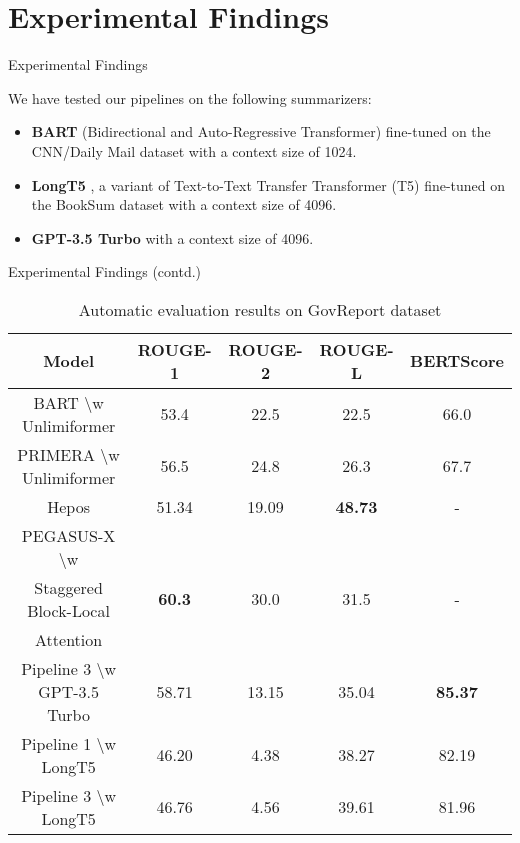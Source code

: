 \section{Experimental Findings}

\begin{frame}{Experimental Findings}

	We have tested our pipelines on the following summarizers:
	
	\begin{itemize}
		\item<2-> \textbf{BART} (Bidirectional and Auto-Regressive Transformer)
		\citep{lewis-etal-2020-bart} fine-tuned on the CNN/Daily Mail dataset
		with a context size of 1024.
		\item<3-> \textbf{LongT5} \citep{guo2021longt5}, a variant of Text-to-Text
		Transfer Transformer (T5) \citep{raffel2020exploring} fine-tuned on the
		BookSum dataset with a context size of 4096.
		\item<4> \textbf{GPT-3.5 Turbo} \citep{brown2020language} with a context
		size of 4096.
	\end{itemize}
	
\end{frame}

\begin{frame}{Experimental Findings (contd.)}

	\begin{table}[!ht]
		\centering
		\tiny
	
		\begin{tabular}{c c c c c}
			\hline
			\textbf{Model} & \textbf{ROUGE-1} & \textbf{ROUGE-2} & \textbf{ROUGE-L} &
			\textbf{BERTScore} \\
			\hline
			BART \textbackslash w Unlimiformer & 53.4 & 22.5 & 22.5 & 66.0 \\
			PRIMERA \textbackslash w Unlimiformer & 56.5 & 24.8 & 26.3 & 67.7 \\
			Hepos & 51.34 & 19.09 & \textbf{48.73} & - \\
			PEGASUS-X \textbackslash w & & & & \\
			Staggered Block-Local & \textbf{60.3} & 30.0 & 31.5 & - \\
			Attention & & & & \\
			\hline
			Pipeline 3 \textbackslash w GPT-3.5 Turbo & 58.71 & 13.15 & 35.04 & \textbf{85.37} \\
			Pipeline 1 \textbackslash w LongT5 & 46.20 & 4.38 & 38.27 & 82.19 \\
			Pipeline 3 \textbackslash w LongT5 & 46.76 & 4.56 & 39.61 & 81.96 \\
			\hline
		\end{tabular}
	
		\caption{Automatic evaluation results on GovReport dataset}
		\label{tab:results}
	\end{table}
	
\end{frame}
